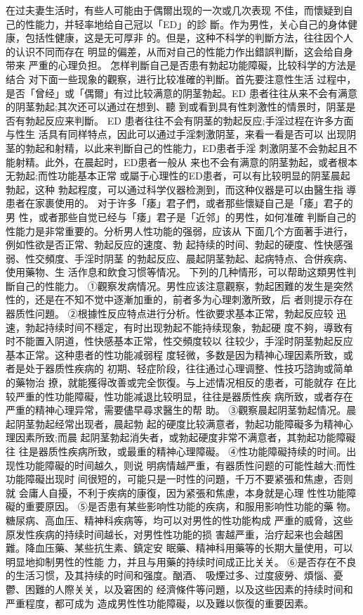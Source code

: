\documentclass[12pt,UTF8]{ctexbook}
\begin{document}
在过夫妻生活时，有些人可能由于偶爾出现的一次或几次表现
不佳，而懷疑到自己的性能力，并轻率地给自己冠以「ED」的診
斷。作为男性，关心自己的身体健康，包括性健康，这是无可厚非
的。但是，这种不科学的判斷方法，往往因个人的认识不同而存在
明显的偏差，从而对自己的性能力作出錯誤判斷，这会给自身带来
严重的心理负担。
怎样判斷自己是否患有勃起功能障礙，比较科学的方法是结合
对下面一些现象的觀察，进行比较准確的判斷。首先要注意性生活
过程中，是否「曾经」或「偶爾」有过比较满意的阴茎勃起。ED
患者往往从来不会有满意的阴茎勃起;其次还可以通过在想到、聽
到或看到具有性刺激性的情景时，阴茎是否有勃起反应来判斷。
ED 患者往往不会有阴茎的勃起反应;手淫过程在许多方面与性生
活具有同样特点，因此可以通过手淫刺激阴茎，来看一看是否可以
出现阴茎的勃起和射精，以此来判斷自己的性能力，ED患者手淫
刺激阴茎不会勃起且不能射精。此外，在晨起时，ED患者一般从
来也不会有满意的阴茎勃起，或者根本无勃起;而性功能基本正常
或屬于心理性的ED患者，可以有比较明显的阴茎晨起勃起，这种
勃起程度，可以通过科学仪器检測到，而这种仪器是可以由醫生指
導患者在家裹使用的。
对于许多「痿」君子們，或者那些懷疑自己是「痿」君子的男
性，或者那些自觉已经与「痿」君子是「近邻」的男性，如何准確
判斷自己的性能力是非常重要的。分析男人性功能的强弱，应该从
下面几个方面著手进行，例如性欲是否正常、勃起反应的速度、勃
起持续的时间、勃起的硬度、性快感强弱、性交頻度、手淫时阴茎
的勃起反应、晨起阴茎勃起、起病特点、合併疾病、使用藥物、生
活作息和飲食习惯等情况。
下列的几种情形，可以帮助这類男性判斷自己的性能力。
①觀察发病情况。男性应该注意觀察，勃起困難的发生是突然
性的，还是在不知不觉中逐漸加重的，前者多为心理刺激所致，后
者则提示存在器质性问題。
②根據性反应特点进行分析。性欲要求基本正常，勃起反应较
迅速，勃起持续时间不穩定，有时出现勃起不能持续现象，勃起硬
度不夠，導致有时不能置入阴道，性快感基本正常，性交頻度较以
往较少，手淫时阴茎勃起反应基本正常。这种患者的性功能减弱程
度轻微，多数是因为精神心理因素所致，或者是处于器质性疾病的
初期、轻症阶段，往往通过心理调整、性技巧諮詢或简单的藥物治
撩，就能獲得改善或完全恢復。与上述情况相反的患者，可能就存
在比较严重的性功能障礙，性功能减退比较明显，往往是器质性疾
病所致，或者存在严重的精神心理异常，需要儘早尋求醫生的帮
助。
③觀察晨起阴茎勃起情况。晨起阴茎勃起经常出现者，晨起勃
起的硬度比较满意者，勃起功能障礙多为精神心理因素所致;而晨
起阴茎勃起消失者，或勃起硬度非常不满意者，其勃起功能障礙往
往是器质性疾病所致，或最重的精神心理障礙。
④性功能障礙持续的时间。出现性功能障礙的时间越久，则说
明病情越严重，有器质性问题的可能性越大;而性功能障礙出现时
间很短的，可能只是一时性的问題，千万不要紧張和焦慮，否则就
会庸人自擾，不利于疾病的康復，因为紧張和焦慮，本身就是心理
性性功能障礙的重要原因。
⑤是否患有某些影响性功能的疾病，和服用影响性功能的藥
物。糖尿病、高血压、精神科疾病等，均可以对男性的性功能构成
严重的威脅，这些原发性疾病的持续时间越长，对男性性功能的损
害越严重，治疗起来也会越困難。降血压藥、某些抗生素、鎮定安
眠藥、精神科用藥等的长期大量使用，可以明显地抑制男性的性能
力，并且与用藥的持续时间成正比关关。
⑥是否存在不良的生活习惯，及其持续的时间和强度。酗酒、
吸煙过多、过度疲勞、煩惱、憂鬱、困難的人際关关，以及窘困的
经濟條件等问題，以及这些因素的持续时间和严重程度，都可成为
造成男性性功能障礙，以及難以恢復的重要因素。
\end{document}
